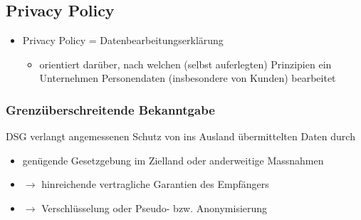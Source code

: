 \subsection{Privacy Policy}
\begin{itemize}
    \item Privacy Policy = Datenbearbeitungserklärung
    \begin{itemize}
        \item orientiert darüber, nach welchen (selbst auferlegten) Prinzipien ein Unternehmen Personendaten (insbesondere von Kunden) bearbeitet
    \end{itemize}
\end{itemize}

\subsubsection{Grenzüberschreitende Bekanntgabe}
DSG verlangt angemessenen Schutz von ins Ausland übermittelten Daten durch
\begin{itemize}
    \item genügende Gesetzgebung im Zielland oder anderweitige Massnahmen
    \item $\rightarrow$ hinreichende vertragliche Garantien des Empfängers
    \item $\rightarrow$ Verschlüsselung oder Pseudo- bzw. Anonymisierung
\end{itemize}